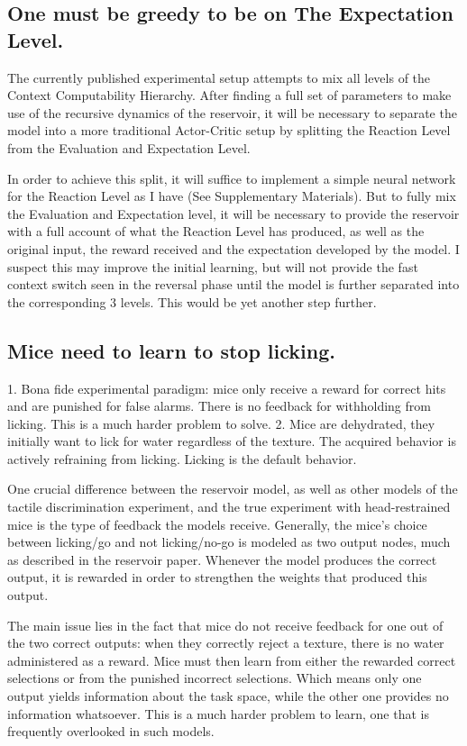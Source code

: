 \documentclass[]{article}
\begin{document}
\subsection{One must be greedy to be on The Expectation Level.}
The currently published experimental setup attempts to mix all levels of the Context Computability Hierarchy.  After finding a full set of parameters to make use of the recursive dynamics of the reservoir, it will be necessary to separate the model into a more traditional Actor-Critic setup by splitting the Reaction Level from the Evaluation and Expectation Level.

In order to achieve this split, it will suffice to implement a simple neural network for the Reaction Level as I have (See Supplementary Materials).  But to fully mix the Evaluation and Expectation level, it will be necessary to provide the reservoir with a full account of what the Reaction Level has produced, as well as the original input, the reward received and the expectation developed by the model.  I suspect this may improve the initial learning, but will not provide the fast context switch seen in the reversal phase until the model is further separated into the corresponding 3 levels.  This would be yet another step further.

\subsection{Mice need to learn to stop licking.}
1. Bona fide experimental paradigm: mice only receive a reward for correct hits and are punished for false alarms.  There is no feedback for withholding from licking.  This is a much harder problem to solve.
2. Mice are dehydrated, they initially want to lick for water regardless of the texture.  The acquired behavior is actively refraining from licking.  Licking is the default behavior.

One crucial difference between the reservoir model, as well as other models of the tactile discrimination experiment, and the true experiment with head-restrained mice is the type of feedback the models receive.  Generally, the mice's choice between licking/go and not licking/no-go is modeled as two output nodes, much as described in the reservoir paper.  Whenever the model produces the correct output, it is rewarded in order to strengthen the weights that produced this output.  

The main issue lies in the fact that mice do not receive feedback for one out of the two correct outputs: when they correctly reject a texture, there is no water administered as a reward.  Mice must then learn from either the rewarded correct selections or from the punished incorrect selections.  Which means only one output yields information about the task space, while the other one provides no information whatsoever.  This is a much harder problem to learn, one that is frequently overlooked in such models.
\end{document}
